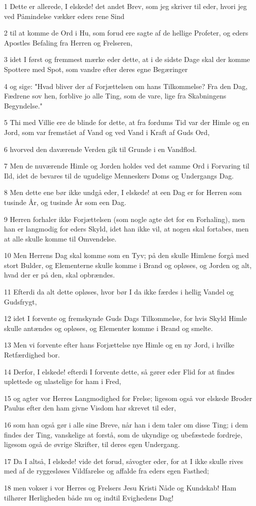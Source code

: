 \par 1 Dette er allerede, I elskede! det andet Brev, som jeg skriver til eder, hvori jeg ved Påmindelse vækker eders rene Sind
\par 2 til at komme de Ord i Hu, som forud ere sagte af de hellige Profeter, og eders Apostles Befaling fra Herren og Frelseren,
\par 3 idet I først og fremmest mærke eder dette, at i de sidste Dage skal der komme Spottere med Spot, som vandre efter deres egne Begæringer
\par 4 og sige: "Hvad bliver der af Forjættelsen om hans Tilkommelse? Fra den Dag, Fædrene sov hen, forblive jo alle Ting, som de vare, lige fra Skabningens Begyndelse."
\par 5 Thi med Villie ere de blinde for dette, at fra fordums Tid var der Himle og en Jord, som var fremstået af Vand og ved Vand i Kraft af Guds Ord,
\par 6 hvorved den daværende Verden gik til Grunde i en Vandflod.
\par 7 Men de nuværende Himle og Jorden holdes ved det samme Ord i Forvaring til Ild, idet de bevares til de ugudelige Menneskers Doms og Undergangs Dag.
\par 8 Men dette ene bør ikke undgå eder, I elskede! at een Dag er for Herren som tusinde År, og tusinde År som een Dag.
\par 9 Herren forhaler ikke Forjættelsen (som nogle agte det for en Forhaling), men han er langmodig for eders Skyld, idet han ikke vil, at nogen skal fortabes, men at alle skulle komme til Omvendelse.
\par 10 Men Herrens Dag skal komme som en Tyv; på den skulle Himlene forgå med stort Bulder, og Elementerne skulle komme i Brand og opløses, og Jorden og alt, hvad der er på den, skal opbrændes.
\par 11 Efterdi da alt dette opløses, hvor bør I da ikke færdes i hellig Vandel og Gudsfrygt,
\par 12 idet I forvente og fremskynde Guds Dags Tilkommelse, for hvis Skyld Himle skulle antændes og opløses, og Elementer komme i Brand og smelte.
\par 13 Men vi forvente efter hans Forjættelse nye Himle og en ny Jord, i hvilke Retfærdighed bor.
\par 14 Derfor, I elskede! efterdi I forvente dette, så gører eder Flid for at findes uplettede og ulastelige for ham i Fred,
\par 15 og agter vor Herres Langmodighed for Frelse; ligesom også vor elskede Broder Paulus efter den ham givne Visdom har skrevet til eder,
\par 16 som han også gør i alle sine Breve, når han i dem taler om disse Ting; i dem findes der Ting, vanskelige at forstå, som de ukyndige og ubefæstede fordreje, ligesom også de øvrige Skrifter, til deres egen Undergang.
\par 17 Da I altså, I elskede! vide det forud, såvogter eder, for at I ikke skulle rives med af de ryggesløses Vildfarelse og affalde fra eders egen Fasthed;
\par 18 men vokser i vor Herres og Frelsers Jesu Kristi Nåde og Kundskab! Ham tilhører Herligheden både nu og indtil Evighedens Dag!




